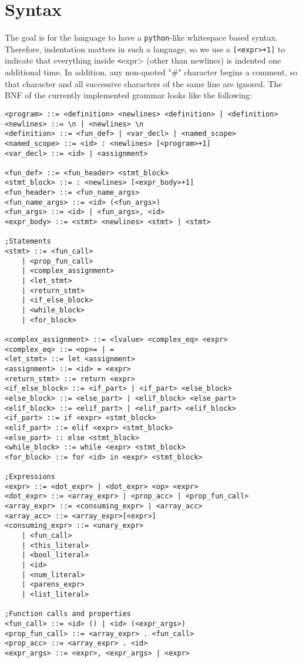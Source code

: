 \documentclass{article}
\begin{document}
\section{Syntax}
The goal is for the language to have a \texttt{python}-like whitespace based syntax. Therefore, indentation matters in such a language, so we use a \texttt{[<expr>+1]} to indicate that everything inside \texttt <expr> (other than newlines) is indented one additional time. In addition, any non-quoted "\#" character begins a comment, so that character and all successive characters of the same line are ignored. The BNF of the currently implemented grammar looks like the following:

\begin{lstlisting}[style=bnf]
<program> ::= <definition> <newlines> <definition> | <definition>
<newlines> ::= \n | <newlines> \n
<definition> ::= <fun_def> | <var_decl> | <named_scope>
<named_scope> ::= <id> : <newlines> [<program>+1]
<var_decl> ::= <id> | <assignment>

<fun_def> ::= <fun_header> <stmt_block>
<stmt_block> ::= : <newlines> [<expr_body>+1]
<fun_header> ::= <fun_name_args>
<fun_name_args> ::= <id> (<fun_args>)
<fun_args> ::= <id> | <fun_args>, <id>
<expr_body> ::= <stmt> <newlines> <stmt> | <stmt>

;Statements
<stmt> ::= <fun_call>
    | <prop_fun_call>
    | <complex_assignment>
    | <let_stmt>
    | <return_stmt>
    | <if_else_block>
    | <while_block>
    | <for_block>

<complex_assignment> ::= <lvalue> <complex_eq> <expr>
<complex_eq> ::= <op>= | =
<let_stmt> ::= let <assignment>
<assignment> ::= <id> = <expr>
<return_stmt> ::= return <expr>
<if_else_block> ::= <if_part> | <if_part> <else_block>
<else_block> ::= <else_part> | <elif_block> <else_part>
<elif_block> ::= <elif_part> | <elif_part> <elif_block>
<if_part> ::= if <expr> <stmt_block>
<elif_part> ::= elif <expr> <stmt_block>
<else_part> :: else <stmt_block>
<while_block> ::= while <expr> <stmt_block>
<for_block> ::= for <id> in <expr> <stmt_block>

;Expressions
<expr> ::= <dot_expr> | <dot_expr> <op> <expr>
<dot_expr> ::= <array_expr> | <prop_acc> | <prop_fun_call>
<array_expr> ::= <consuming_expr> | <array_acc>
<array_acc> ::= <array_expr>[<expr>]
<consuming_expr> ::= <unary_expr>
    | <fun_call>
    | <this_literal>
    | <bool_literal>
    | <id>
    | <num_literal>
    | <parens_expr>
    | <list_literal>

;Function calls and properties
<fun_call> ::= <id> () | <id> (<expr_args>)
<prop_fun_call> ::= <array_expr> . <fun_call>
<prop_acc> ::= <array_expr> . <id>
<expr_args> ::= <expr>, <expr_args> | <expr>


\end{lstlisting}
\end{document}
